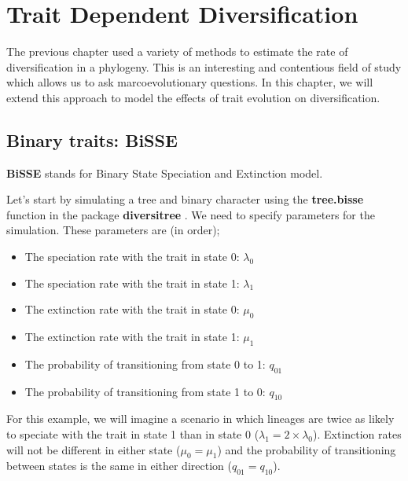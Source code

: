 \documentclass[
]{book}
\providecommand{\tightlist}{%
  \setlength{\itemsep}{0pt}\setlength{\parskip}{0pt}}
\begin{document}
\hypertarget{diversification2}{%
\chapter{Trait Dependent Diversification}\label{diversification2}}

The previous chapter used a variety of methods to estimate the rate of diversification in a phylogeny. This is an interesting and contentious field of study which allows us to ask marcoevolutionary questions. In this chapter, we will extend this approach to model the effects of trait evolution on diversification.

\hypertarget{binary-traits-bisse}{%
\section{Binary traits: BiSSE}\label{binary-traits-bisse}}

\textbf{BiSSE} stands for Binary State Speciation and Extinction model.

Let's start by simulating a tree and binary character using the \textbf{tree.bisse} function in the package \textbf{diversitree} \citep{diversitree}. We need to specify parameters for the simulation. These parameters are (in order);

\begin{itemize}
\tightlist
\item
  The speciation rate with the trait in state 0: \(\lambda_{0}\)
\item
  The speciation rate with the trait in state 1: \(\lambda_{1}\)
\item
  The extinction rate with the trait in state 0: \(\mu_{0}\)
\item
  The extinction rate with the trait in state 1: \(\mu_{1}\)
\item
  The probability of transitioning from state 0 to 1: \(q_{01}\)
\item
  The probability of transitioning from state 1 to 0: \(q_{10}\)
\end{itemize}

For this example, we will imagine a scenario in which lineages are twice as likely to speciate with the trait in state 1 than in state 0 (\(\lambda_{1} = 2 \times\lambda_{0}\)). Extinction rates will not be different in either state (\(\mu_{0} = \mu_{1}\)) and the probability of transitioning between states is the same in either direction (\(q_{01} = q_{10}\)).
\end{document}
